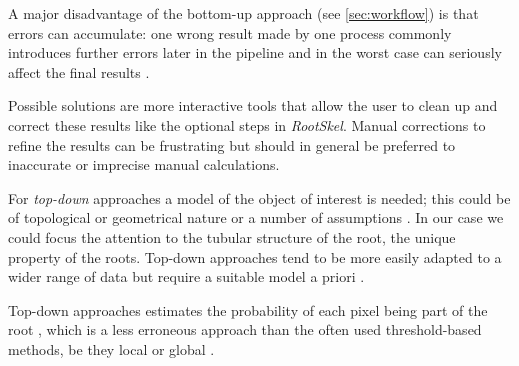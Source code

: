 A major disadvantage of the bottom-up approach (see \ref{sec:workflow}) is that errors can accumulate: one wrong result made by one process commonly introduces further errors later in the pipeline and in the worst case can seriously affect the final results \cite{pound2013rootnav}.

Possible solutions are more interactive tools that allow the user to clean up and correct these results \cite{armengaud2009ez,clark20113} like the optional steps in \textit{RootSkel}. Manual corrections to refine the results can be frustrating but should in general be preferred to inaccurate or imprecise manual calculations.

For \textit{top-down} approaches a model of the object of interest is needed; this could be of topological or geometrical nature \cite{pound2012cellset,taub1996root} or a number of assumptions \cite{mooney2012developing}. In our case we could focus the attention to the tubular structure of the root, the unique property of the roots. Top-down approaches tend to be more easily adapted to a wider range of data but require a suitable model a priori  \cite{pound2013rootnav}.

Top-down approaches estimates the probability of each pixel being part of the root \cite{pound2013rootnav}, which is a less erroneous approach than the often used threshold-based methods, be they local or global \cite{pound2013rootnav}. 


